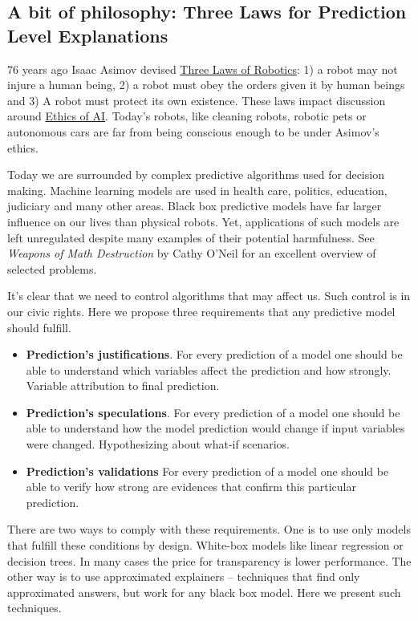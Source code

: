 \documentclass[]{krantz}
\providecommand{\tightlist}{%
  \setlength{\itemsep}{0pt}\setlength{\parskip}{0pt}}
\theoremstyle{definition}
\theoremstyle{definition}
\theoremstyle{definition}
\theoremstyle{remark}
\begin{document}
\hypertarget{three-single-laws}{%
\subsection{A bit of philosophy: Three Laws for Prediction Level
Explanations}\label{three-single-laws}}

76 years ago Isaac Asimov devised
\href{https://en.wikipedia.org/wiki/Three_Laws_of_Robotics}{Three Laws
of Robotics}: 1) a robot may not injure a human being, 2) a robot must
obey the orders given it by human beings and 3) A robot must protect its
own existence. These laws impact discussion around
\href{https://en.wikipedia.org/wiki/Ethics_of_artificial_intelligence}{Ethics
of AI}. Today's robots, like cleaning robots, robotic pets or autonomous
cars are far from being conscious enough to be under Asimov's ethics.

Today we are surrounded by complex predictive algorithms used for
decision making. Machine learning models are used in health care,
politics, education, judiciary and many other areas. Black box
predictive models have far larger influence on our lives than physical
robots. Yet, applications of such models are left unregulated despite
many examples of their potential harmfulness. See \emph{Weapons of Math
Destruction} by Cathy O'Neil \citep{ONeil} for an excellent overview of
selected problems.

It's clear that we need to control algorithms that may affect us. Such
control is in our civic rights. Here we propose three requirements that
any predictive model should fulfill.

\begin{itemize}
\tightlist
\item
  \textbf{Prediction's justifications}. For every prediction of a model
  one should be able to understand which variables affect the prediction
  and how strongly. Variable attribution to final prediction.
\item
  \textbf{Prediction's speculations}. For every prediction of a model
  one should be able to understand how the model prediction would change
  if input variables were changed. Hypothesizing about what-if
  scenarios.
\item
  \textbf{Prediction's validations} For every prediction of a model one
  should be able to verify how strong are evidences that confirm this
  particular prediction.
\end{itemize}

There are two ways to comply with these requirements. One is to use only
models that fulfill these conditions by design. White-box models like
linear regression or decision trees. In many cases the price for
transparency is lower performance. The other way is to use approximated
explainers -- techniques that find only approximated answers, but work
for any black box model. Here we present such techniques.
\end{document}
